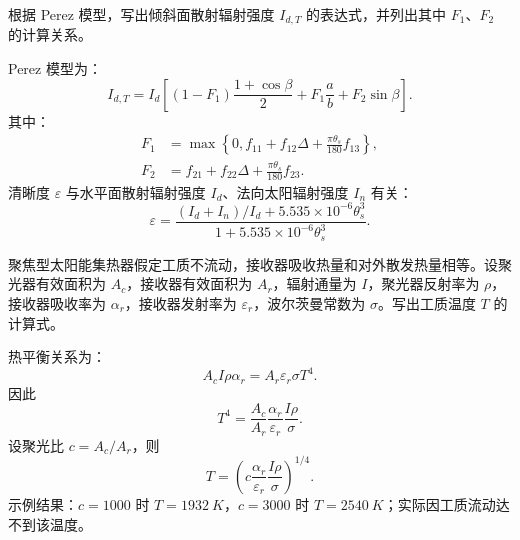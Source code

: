 \begin{problem}[倾斜面散射辐射强度]\label{exer:calc_04_solar_p036_01}
根据 Perez 模型，写出倾斜面散射辐射强度 \(I_{d,T}\) 的表达式，并列出其中 \(F_1\)、\(F_2\) 的计算关系。
\end{problem}

\begin{solution}
Perez 模型为：
\begin{equation}
I_{d,T}
= I_d\left[(1-F_1)\frac{1+\cos\beta}{2}
+ F_1\frac{a}{b}
+ F_2\sin\beta\right].
\end{equation}
其中：
\begin{equation*}
\begin{aligned}
F_1 &= \max\left\{0, f_{11} + f_{12}\Delta + \frac{\pi\theta_s}{180}f_{13}\right\},\\
F_2 &= f_{21} + f_{22}\Delta + \frac{\pi\theta_s}{180}f_{23}.
\end{aligned}
\end{equation*}
清晰度 \(\varepsilon\) 与水平面散射辐射强度 \(I_d\)、法向太阳辐射强度 \(I_n\) 有关：
\begin{equation}
\varepsilon
= \frac{(I_d + I_n)/I_d + 5.535 \times 10^{-6}\theta_s^3}
{1 + 5.535 \times 10^{-6}\theta_s^3}.
\end{equation}
\end{solution}

\begin{problem}[聚焦型太阳能集热器工质温度]\label{exer:calc_04_solar_p065_01}
聚焦型太阳能集热器假定工质不流动，接收器吸收热量和对外散发热量相等。设聚光器有效面积为 \(A_c\)，接收器有效面积为 \(A_r\)，辐射通量为 \(I\)，聚光器反射率为 \(\rho\)，接收器吸收率为 \(\alpha_r\)，接收器发射率为 \(\varepsilon_r\)，波尔茨曼常数为 \(\sigma\)。写出工质温度 \(T\) 的计算式。
\end{problem}

\begin{solution}
热平衡关系为：
\begin{equation}
A_c I\rho\alpha_r = A_r\varepsilon_r\sigma T^4.
\end{equation}
因此
\begin{equation}
T^4 = \frac{A_c}{A_r}\frac{\alpha_r}{\varepsilon_r}\frac{I\rho}{\sigma}.
\end{equation}
设聚光比 \(c = A_c/A_r\)，则
\begin{equation}
T = \left(c\frac{\alpha_r}{\varepsilon_r}\frac{I\rho}{\sigma}\right)^{1/4}.
\end{equation}
示例结果：\(c = 1000\) 时 \(T = \qty{1932}{K}\)，\(c = 3000\) 时 \(T = \qty{2540}{K}\)；实际因工质流动达不到该温度。
\end{solution}

